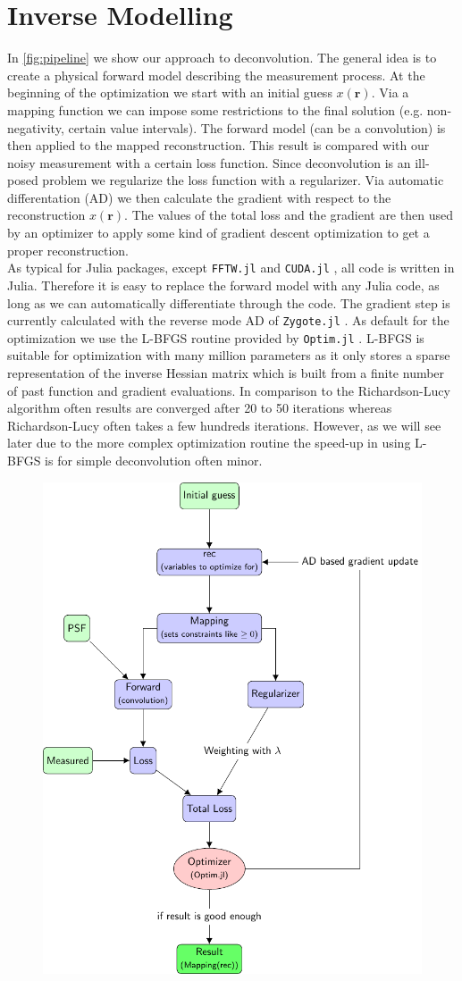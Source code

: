 \documentclass{juliacon}
\begin{document}
   
\section{Inverse Modelling}
In \autoref{fig:pipeline} we show our approach to deconvolution.
The general idea is to create a physical forward model describing the measurement process.
At the beginning of the optimization we start with an initial guess $x(\mathbf r)$. 
Via a mapping function we can impose some restrictions to the final solution (e.g. non-negativity, certain value intervals).
The forward model (can be a convolution) is then applied to the mapped reconstruction. This result is compared
with our noisy measurement with a certain loss function.
Since deconvolution is an ill-posed problem we regularize the loss function with a regularizer.
Via automatic differentation (AD) we then calculate the gradient with respect to the reconstruction $x(\mathbf r)$. 
The values of the total loss and the gradient are then used by an optimizer to apply some kind of gradient descent optimization to get a proper reconstruction.\\

As typical for Julia packages, except \verb|FFTW.jl| and \verb|CUDA.jl| \cite{besard2018juliagpu}, all code is written in Julia.
Therefore it is easy to replace the forward model with any Julia code, as long as we can 
automatically differentiate through the code. The gradient step is currently calculated with the reverse mode AD of \verb|Zygote.jl| \cite{Zygote.jl-2018}. 
As default for the optimization we use the L-BFGS \cite{LBFGS} routine provided by \verb|Optim.jl| \cite{mogensen2018optim}.
L-BFGS is suitable for optimization with many million parameters as it only stores a sparse representation of the inverse Hessian matrix
which is built from a finite number of past function and gradient evaluations. 
In comparison to the Richardson-Lucy algorithm often results are converged after 20 to 50 iterations whereas Richardson-Lucy often takes
a few hundreds iterations. However, as we will see later due to the more complex optimization routine the speed-up in using L-BFGS is for simple 
deconvolution often minor.


\begin{figure}[h]
    \centering
    \includegraphics[width = .5\textwidth]{figures/pipeline.pdf}
    \caption{}
    \label{fig:pipeline}
\end{figure}
\end{document}

